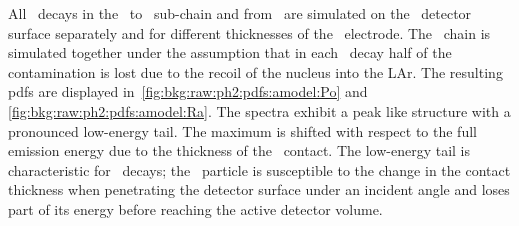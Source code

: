 All \a\ decays in the \Ra\ to \Pbl\ sub-chain and from \Po\ are
simulated on the \pplus\ detector surface separately and for different
thicknesses of the \pplus\ electrode. The \Ra\ chain is simulated
together under the assumption that in each \a\ decay half of the
contamination is lost due to the recoil of the nucleus into the LAr. The
resulting pdfs are displayed in~\cref{fig:bkg:raw:ph2:pdfs:amodel:Po}
and \cref{fig:bkg:raw:ph2:pdfs:amodel:Ra}. The spectra exhibit a peak
like structure with a pronounced low-energy tail.  The maximum is
shifted with respect to the full emission energy due to the thickness of
the \pplus\ contact.  The low-energy tail is characteristic for \a\
decays; the \a\ particle is susceptible to the change in the contact
thickness when penetrating the detector surface under an incident angle
and loses part of its energy before reaching the active detector volume.



